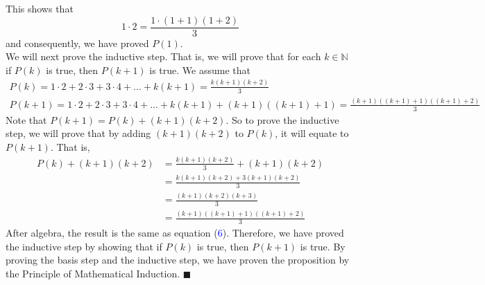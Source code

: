 \documentclass{article}
\begin{document}
This shows that 
\begin{equation*}
1 \cdot 2 = \frac{1 \cdot (1 + 1)(1 + 2)}{3}
\end{equation*} and consequently, we have proved $P(1)$.\\

We will next prove the inductive step. That is, we will prove that for each $k \in \mathbb{N}$ if $P(k)$ is true, then $P(k + 1)$ is true. We assume that
\begin{align}
P(k) = 1\cdot2 + 2\cdot3 + 3\cdot4 + ... + k(k + 1) = \frac{k(k + 1)(k + 2)}{3}\\
P(k + 1) = 1\cdot2 + 2\cdot3 + 3\cdot4 + ... + k(k + 1) + (k + 1)((k + 1) + 1) = \frac{(k + 1)((k + 1) + 1)((k + 1) + 2)}{3}
\end{align}
Note that $P(k + 1) = P(k) + (k + 1)(k + 2)$. So to prove the inductive step, we will prove that by adding $(k + 1)(k + 2)$ to $P(k)$, it will equate to $P(k + 1)$. That is,
\begin{align*}
P(k) + (k + 1)(k + 2) &= \frac{k(k + 1)(k + 2)}{3} + (k + 1)(k + 2)\\
&= \frac{k(k + 1)(k + 2) + 3(k + 1)(k + 2)}{3}\\
&= \frac{(k + 1)(k + 2)(k + 3)}{3}\\
&= \frac{(k + 1)((k + 1) + 1)((k + 1) + 2)}{3}
\end{align*}
After algebra, the result is the same as equation (\textcolor{blue}{6}). Therefore, we have proved the inductive step by showing that if $P(k)$ is true, then $P(k + 1)$ is true. By proving the basis step and the inductive step, we have proven the proposition by the Principle of Mathematical Induction. \hfill$\blacksquare$
\end{document}
